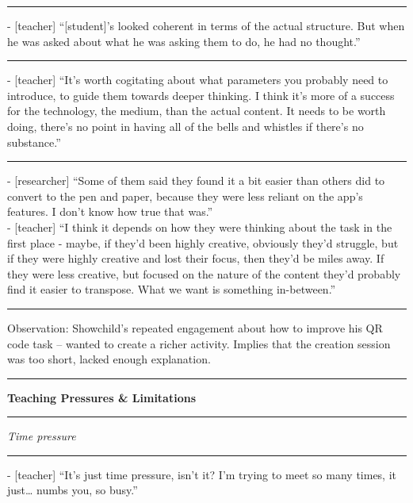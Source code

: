 {\centering
  \noindent\rule{0.5\textwidth}{0.4pt}\par
}

- [teacher] “[student]’s looked coherent in terms of the actual structure. But when he was asked about what he was asking them to do, he had no thought.”

{\centering
  \noindent\rule{0.5\textwidth}{0.4pt}\par
}

- [teacher] “It’s worth cogitating about what parameters you probably need to introduce, to guide them towards deeper thinking. I think it’s more of a success for the technology, the medium, than the actual content. It needs to be worth doing, there’s no point in having all of the bells and whistles if there’s no substance.”

{\centering
  \noindent\rule{0.5\textwidth}{0.4pt}\par
}

- [researcher] “Some of them said they found it a bit easier than others did to convert to the pen and paper, because they were less reliant on the app’s features. I don’t know how true that was.”\\
- [teacher] “I think it depends on how they were thinking about the task in the first place - maybe, if they’d been highly creative, obviously they’d struggle, but if they were highly creative and lost their focus, then they’d be miles away. If they were less creative, but focused on the nature of the content they’d probably find it easier to transpose. What we want is something in-between.”

{\centering
  \noindent\rule{0.5\textwidth}{0.4pt}\par
}

Observation: Showchild’s repeated engagement about how to improve his QR code task – wanted to create a richer activity. Implies that the creation session was too short, lacked enough explanation.

\par\noindent\rule{\textwidth}{1pt}

\textbf{Teaching Pressures \& Limitations}

\par\noindent\rule{\textwidth}{1pt}

\textit{Time pressure}

\par\noindent\rule{\textwidth}{1pt}

- [teacher] “It’s just time pressure, isn’t it? I’m trying to meet so many times, it just… numbs you, so busy.”


